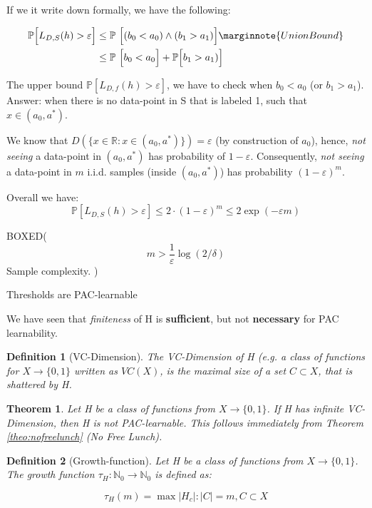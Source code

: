 \documentclass{scrarticle}
\newtheorem{theorem}{Theorem}[section]
\newtheorem{definition}{Definition}[section]
\begin{document}
If we it write down formally, we have the following: 


\begin{align}
        \mathbb{P} \Big [ L_{D,S} (h)  > \varepsilon \Big ] &\leq \mathbb{P}\ \Big [(b_0 < a_0) \wedge (b_1 > a_1) \Big ] \marginnote{Union Bound} \\
        &\leq \mathbb{P}\ \Big [b_0 < a_0\Big ]+ \mathbb{P}\Big [ b_1 > a_1) \Big ] 
\end{align}

The upper bound $\mathbb{P}[L_{D,f}(h) > \varepsilon]$, we have to check when $b_0 < a_0$ (or $b_1 > a_1$). Answer: when there is no data-point in S that is labeled 1, such that $x \in (a_0, a^*)$.

We know that $D(\{x \in \mathbb{R}: x \in (a_0, a^*)\})=\varepsilon$ (by construction of $a_0$), hence, \textit{not seeing} a data-point in $(a_0, a^*)$ has probability of $1-\varepsilon$. Consequently, \textit{not seeing} a data-point in $m$ i.i.d. samples (inside $(a_0, a^*)$) has probability $(1-\varepsilon)^m$.
 
Overall we have:
\begin{equation*}
    \mathbb{P}[L_{D,S}(h) > \varepsilon] \leq 2 \cdot (1-\varepsilon)^m \leq 2\exp(-\varepsilon m)
\end{equation*}

BOXED(
\begin{equation*}
    m > \frac{1}{\varepsilon}  \log(2 / \delta)
\end{equation*}
Sample complexity. 
)


Thresholds are PAC-learnable 

We have seen that \textit{finiteness} of H is \textbf{sufficient}, but not \textbf{necessary} for PAC learnability. 


\begin{definition}[VC-Dimension]
    The VC-Dimension of H (e.g. a class of functions for $X \to \{0,1\}$ written as $VC(X)$, is the maximal size of a set $C \subset X$, that is shattered by H.
\end{definition}

\begin{theorem}
    Let H be a class of functions from $X \to \{0,1\}$. If H has infinite VC-Dimension, then H is not PAC-learnable. This follows immediately from Theorem \ref{theo:nofreelunch} (\textit{No Free Lunch}).
\end{theorem}

\begin{definition}[Growth-function]
    Let H be a class of functions from $X \to \{0,1\}$. The \textit{growth function} $\tau_H: \mathbb{N}_0 \to \mathbb{N}_0$ is defined as: 

    \begin{equation}
        \tau_H(m)= \max |H_c| : |C|=m,  C \subset X
    \end{equation}
\end{definition}
\end{document}

